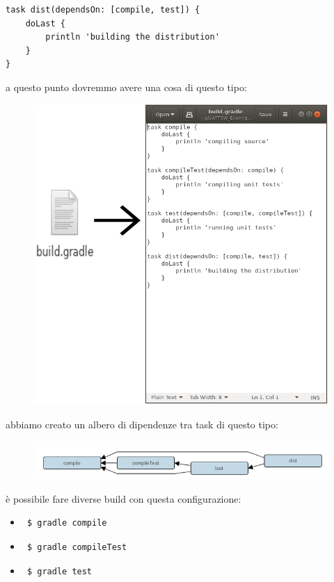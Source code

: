 \documentclass{article}
\begin{document}
\begin{flushleft}
\begin{verbatim}
task dist(dependsOn: [compile, test]) {
    doLast {
        println 'building the distribution'
    }
}
\end{verbatim}
a questo punto dovremmo avere una cosa di questo tipo:
\begin{figure}[H]
\includegraphics[scale=0.40]{gradleexamplefirst.png}
\end{figure} 
abbiamo creato un albero di dipendenze tra task di questo tipo:
\label{taskdip}
\begin{figure}[H]
\includegraphics[scale=0.70]{taskdipendence.png}
\end{figure} 
è possibile fare diverse build con questa configurazione:
\begin{itemize}
    \item \begin{verbatim} $ gradle compile \end{verbatim}
    \item \begin{verbatim} $ gradle compileTest \end{verbatim}
    \item \begin{verbatim} $ gradle test \end{verbatim}

\end{itemize}
\end{flushleft}
\end{document}
